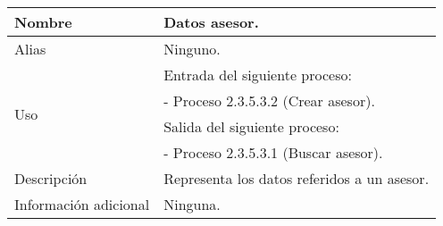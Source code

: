 \begin{center}
  \begin{tabular}{| l | p{9cm} |}
    \hline
    Nombre & \textbf{Datos asesor}.\\
    \hline
    Alias & Ninguno.\\
    \hline
    \multirow{4}{*}{Uso} & Entrada del siguiente proceso:\\
                         & - Proceso 2.3.5.3.2 (Crear asesor).\\
                         & Salida del siguiente proceso:\\
                         & - Proceso 2.3.5.3.1 (Buscar asesor).\\
    \hline
    Descripción & Representa los datos referidos a un asesor.\\
    \hline
    Información adicional & Ninguna.\\
    \hline
  \end{tabular}
\end{center}
